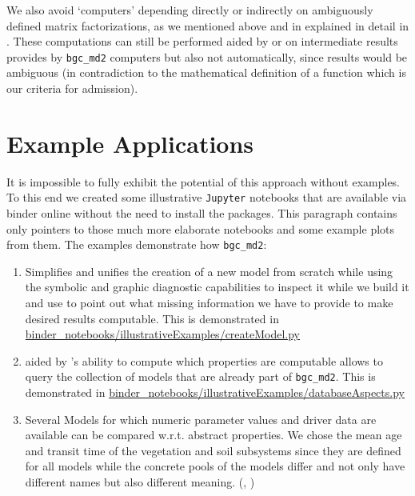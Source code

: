 We also avoid `computers' depending directly or indirectly on ambiguously defined matrix factorizations, 
as we mentioned above and in explained in detail in . 
These computations can still be performed aided by  \LAPM{} or \CompartmentalSystems{} on intermediate results
provides by \texttt{bgc\_md2} computers but also not automatically, since results would be ambiguous (in contradiction to the mathematical definition of a function which is our criteria  for admission). 


\section{Example Applications}  
\label{sec:ExampleApplications}
It is impossible to fully exhibit the potential of this approach without
examples.
To this end we created some illustrative \texttt{Jupyter} notebooks that are
available via binder online without the need to install the packages. 
This paragraph contains only pointers to those much more elaborate notebooks
and some example plots from them.
The examples demonstrate how \texttt{bgc_md2}:
\begin{enumerate}
\item 
  Simplifies and unifies the creation of a new model from scratch while using the
  symbolic and graphic diagnostic capabilities to inspect it while we build it
  and use 
  \ComputabilityGraphs{} to point out what missing information we have to
  provide to make desired results computable.
  This is demonstrated in
    \href{https://github.com/MPIBGC-TEE/bgc_md2/blob/binder/binder_notebooks/illustrativeExamples/createModel.py}{binder_notebooks/illustrativeExamples/createModel.py}
    
\item 
  aided by \ComputabilityGraphs{} 's ability to compute which properties are computable
  allows to query the collection of models that are already part of
  \texttt{bgc\_md2}.
  This is demonstrated in
    \href{https://github.com/MPIBGC-TEE/bgc_md2/blob/binder/binder_notebooks/illustrativeExamples/databaseAspects.py}{binder_notebooks/illustrativeExamples/databaseAspects.py}
\item 
  \label{enum:trendy}
  Several Models for which numeric parameter values and driver data are
  available can be compared w.r.t. abstract properties.
  We chose the mean age and transit time of the vegetation and soil subsystems
  since they are defined for all models while the concrete pools of the models
  differ and not only have different names but also different meaning.
  (,  )
\end{enumerate}
